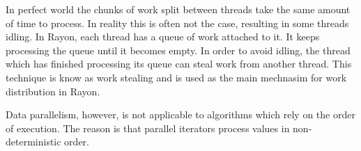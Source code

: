 \begin{figure}

\end{figure}


In perfect world the chunks of work split between threads take the same amount of time to process. In reality this is often not the case, resulting in some threads idling. In Rayon, each thread has a queue of work attached to it. It keeps processing the queue until it becomes empty. In order to avoid idling, the thread which has finished processing its queue can steal work from another thread. This technique is know as work stealing and is used as the main mechnasim for work distribution in Rayon. 





Data parallelism, however, is not applicable to algorithms which rely on the order of execution. The reason is that parallel iterators process values in non-deterministic order. 

